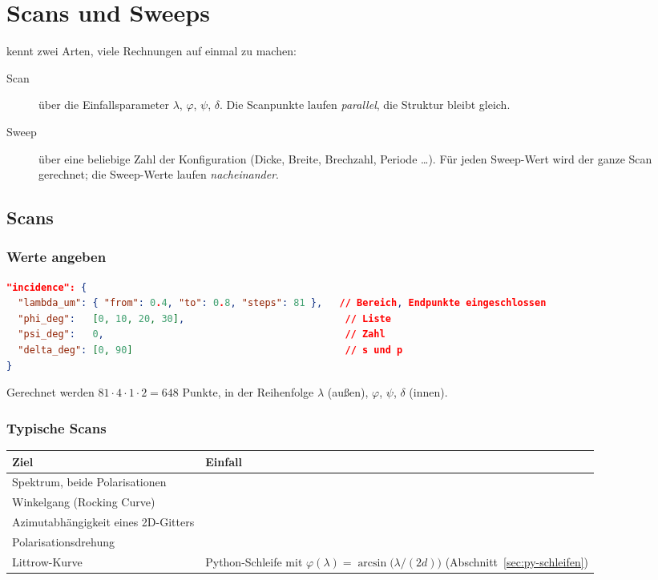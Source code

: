 \chapter{Scans und Sweeps}\label{ch:scans}

\FG{} kennt zwei Arten, viele Rechnungen auf einmal zu machen:
\begin{description}
  \item[Scan] über die Einfallsparameter $\lambda$, $\varphi$, $\psi$, $\delta$. Die Scanpunkte laufen
        \emph{parallel}, die Struktur bleibt gleich.
  \item[Sweep] über eine beliebige Zahl der Konfiguration (Dicke, Breite, Brechzahl, Periode \ldots). Für jeden
        Sweep-Wert wird der ganze Scan gerechnet; die Sweep-Werte laufen \emph{nacheinander}.
\end{description}

\section{Scans}
%
\subsection{Werte angeben}
\begin{lstlisting}[language=json]
"incidence": {
  "lambda_um": { "from": 0.4, "to": 0.8, "steps": 81 },   // Bereich, Endpunkte eingeschlossen
  "phi_deg":   [0, 10, 20, 30],                            // Liste
  "psi_deg":   0,                                          // Zahl
  "delta_deg": [0, 90]                                     // s und p
}
\end{lstlisting}
Gerechnet werden $81\cdot4\cdot1\cdot2=648$ Punkte, in der Reihenfolge $\lambda$ (außen), $\varphi$, $\psi$, $\delta$
(innen).

\subsection{Typische Scans}
\begin{center}
\small
\begin{tabularx}{\linewidth}{lY}
\toprule
Ziel & Einfall \\
\midrule
Spektrum, beide Polarisationen &  \\
Winkelgang (Rocking Curve) &  \\
Azimutabhängigkeit eines 2D-Gitters &  \\
Polarisationsdrehung &  \\
Littrow-Kurve & Python-Schleife mit $\varphi(\lambda)=\arcsin\bigl(\lambda/(2d)\bigr)$ (Abschnitt~\ref{sec:py-schleifen}) \\
\bottomrule
\end{tabularx}
\end{center}

